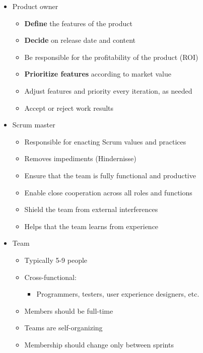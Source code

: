 \begin{itemize}
\tightlist
\item
  Product owner

  \begin{itemize}
  \tightlist
  \item
    \textbf{Define} the features of the product
  \item
    \textbf{Decide} on release date and content
  \item
    Be responsible for the profitability of the product (ROI)
  \item
    \textbf{Prioritize features} according to market value
  \item
    Adjust features and priority every iteration, as needed
  \item
    Accept or reject work results
  \end{itemize}
\item
  Scrum master

  \begin{itemize}
  \tightlist
  \item
    Responsible for enacting Scrum values and practices
  \item
    Removes impediments (Hindernisse)
  \item
    Ensure that the team is fully functional and productive
  \item
    Enable close cooperation across all roles and functions
  \item
    Shield the team from external interferences
    \item
    Helps that the team learns from experience
  \end{itemize}
  
\item
  Team
  \begin{itemize}
  \tightlist
  \item
    Typically 5-9 people
  \item
    Cross-functional:

    \begin{itemize}
    \tightlist
    \item
      Programmers, testers, user experience designers, etc.
    \end{itemize}
  \item
    Members should be full-time
  \item
    Teams are self-organizing
  \item
    Membership should change only between sprints
  \end{itemize}
\end{itemize}

























